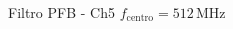 \documentclass[ignorenonframetext,12pt]{beamer}
\begin{document}
\begin{frame}{Filtro PFB - Ch5 $f_\text{centro}= 512\,\text{MHz}$}
				\begin{center}
				\end{center}
				\vspace{-1.2cm}
				\begin{center}
				\end{center}
				\vspace{-1.8cm}
				\begin{columns}
								\begin{column}{0.5\textwidth}
												\begin{center}

\end{center}
\end{column}
\end{columns}
\end{frame}
\end{document}
